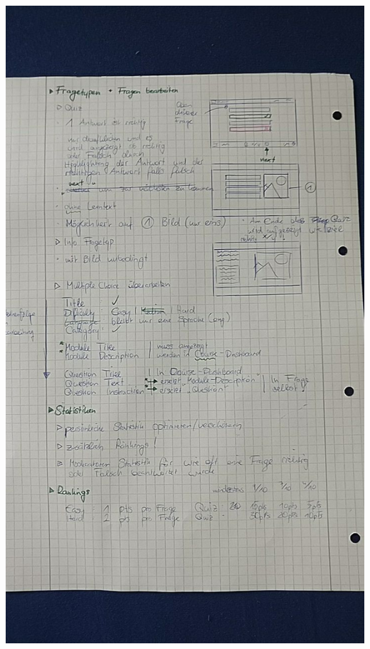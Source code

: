 \documentclass[accentcolor=tud0b,12pt,paper=a4]{tudreport}
\begin{document}
		\includegraphics[height=\textheight]{appendix/Protokolle/IMG_20170830_104104.jpg}
		
	\pagebreak
	
\end{document}

